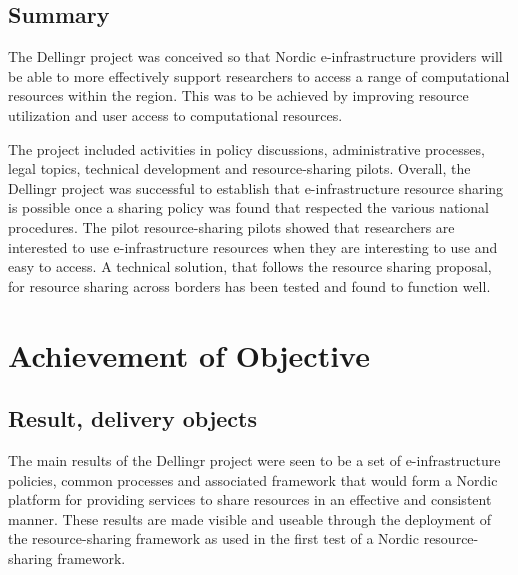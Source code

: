 \documentclass{article}
\newcommand{\dell}{Dellingr\xspace}
\newcommand{\einfra}{e-infrastructure\xspace}
\newcommand{\pilot}{first test of a Nordic resource-sharing framework\xspace}
\begin{document}
\subsection{Summary}

The \dell project was conceived so that Nordic \einfra providers will be able to more effectively support researchers to access a range of computational resources within the region.
This was to be achieved by improving resource utilization and user access to computational resources.

The project included activities in policy discussions, administrative processes, legal topics, technical development and resource-sharing pilots.
Overall, the \dell project was successful to establish that \einfra resource sharing is possible once a sharing policy was found that
respected the various national procedures.
The pilot resource-sharing pilots showed that researchers are interested to use \einfra resources when they are interesting to use and easy to access.
A technical solution, that follows the resource sharing proposal, for resource sharing across borders has been tested and found to function well.

\section{Achievement of Objective}

\subsection{Result, delivery objects}

The main results of the \dell project were seen to be a set of \einfra policies, common processes and associated framework that would form a Nordic platform for providing services to share resources in an effective and consistent manner.
These results are made visible and useable through the deployment of the resource-sharing framework as used in the \pilot.
\end{document}
